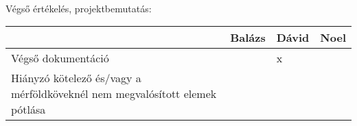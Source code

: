 \\
Végső értékelés, projektbemutatás:


\begin{tabular}{ |p{3cm}|p{3cm}|p{3cm}|p{3cm}|  }
    \hline
    &Balázs & Dávid & Noel \\
    \hline
    Végső dokumentáció&&x& \\
    \hline
    Hiányzó kötelező és/vagy a mérföldköveknél nem megvalósított elemek pótlása&&&& \\
    \hline
\end{tabular}